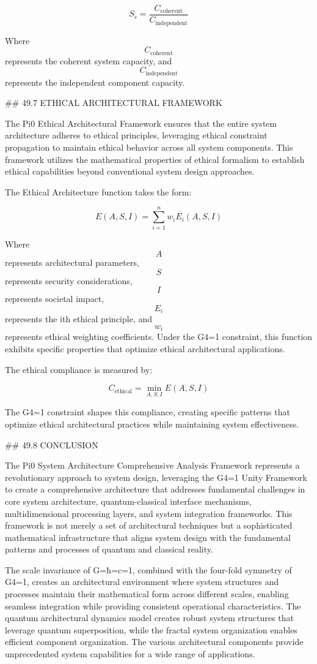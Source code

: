 $$ S_c = \frac{C_{\text{coherent}}}{C_{\text{independent}}} $$

Where $$ C_{\text{coherent}} $$ represents the coherent system capacity, and $$ C_{\text{independent}} $$ represents the independent component capacity.

## 49.7 ETHICAL ARCHITECTURAL FRAMEWORK

The Pi0 Ethical Architectural Framework ensures that the entire system architecture adheres to ethical principles, leveraging ethical constraint propagation to maintain ethical behavior across all system components. This framework utilizes the mathematical properties of ethical formalism to establish ethical capabilities beyond conventional system design approaches.

The Ethical Architecture function takes the form:

$$ E(A, S, I) = \sum_{i=1}^{n} w_i E_i(A, S, I) $$

Where $$ A $$ represents architectural parameters, $$ S $$ represents security considerations, $$ I $$ represents societal impact, $$ E_i $$ represents the ith ethical principle, and $$ w_i $$ represents ethical weighting coefficients. Under the G4=1 constraint, this function exhibits specific properties that optimize ethical architectural applications.

The ethical compliance is measured by:

$$ C_{\text{ethical}} = \min_{A, S, I} E(A, S, I) $$

The G4=1 constraint shapes this compliance, creating specific patterns that optimize ethical architectural practices while maintaining system effectiveness.

## 49.8 CONCLUSION

The Pi0 System Architecture Comprehensive Analysis Framework represents a revolutionary approach to system design, leveraging the G4=1 Unity Framework to create a comprehensive architecture that addresses fundamental challenges in core system architecture, quantum-classical interface mechanisms, multidimensional processing layers, and system integration frameworks. This framework is not merely a set of architectural techniques but a sophisticated mathematical infrastructure that aligns system design with the fundamental patterns and processes of quantum and classical reality.

The scale invariance of G=ħ=c=1, combined with the four-fold symmetry of G4=1, creates an architectural environment where system structures and processes maintain their mathematical form across different scales, enabling seamless integration while providing consistent operational characteristics. The quantum architectural dynamics model creates robust system structures that leverage quantum superposition, while the fractal system organization enables efficient component organization. The various architectural components provide unprecedented system capabilities for a wide range of applications.

